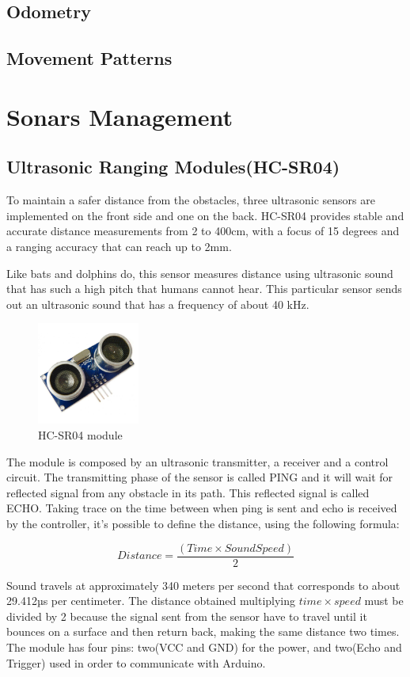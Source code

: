 \subsection{Odometry}
\subsection{Movement Patterns}
\section{Sonars Management}
\subsection{Ultrasonic Ranging Modules(HC-SR04)}
To maintain a safer distance from the obstacles, three ultrasonic sensors are implemented on the front side and one on the back. HC-SR04 provides stable and accurate distance measurements from 2 to 400cm, with a focus of 15 degrees and a ranging accuracy that can reach up to 2mm.

Like bats and dolphins do, this sensor measures distance using ultrasonic sound that has such a high pitch that humans cannot hear. This particular sensor sends out an ultrasonic sound that has a frequency of about 40 kHz.\cite{hcsr04:datasheet}

\begin{figure}[h]
	\centering
	\includegraphics[width=0.3\textwidth]{hc-sr04}
	\caption{HC-SR04 module}
\end{figure}

The module is composed by an ultrasonic transmitter, a receiver and a control circuit. The transmitting phase of the sensor is called PING and it will wait for reflected signal from any obstacle in its path. This reflected signal is called ECHO. Taking trace on the time between when ping is sent and echo is received by the controller, it's possible to define the distance, using the following formula:

$$Distance = \frac{(Time \times SoundSpeed)}{2} $$

Sound travels at approximately 340 meters per second that corresponds to about 29.412µs per centimeter. The distance obtained multiplying $time\times speed$ must be divided by 2 because the signal sent from the sensor have to travel until it bounces on a surface and then return back, making the same distance two times.\\
The module has four pins: two(VCC and GND) for the power, and two(Echo and Trigger) used in order to communicate with Arduino.

